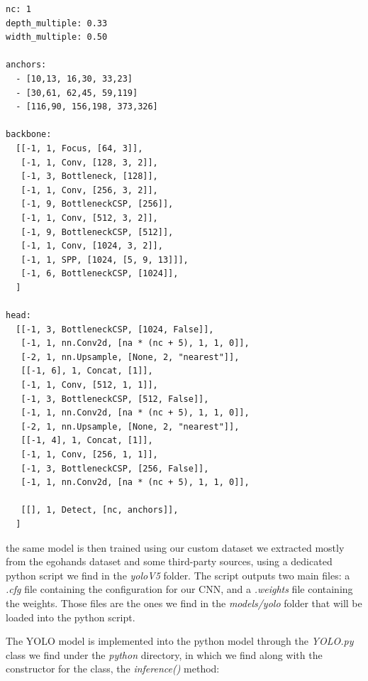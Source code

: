 \begin{lstlisting}[]
nc: 1
depth_multiple: 0.33
width_multiple: 0.50

anchors:
  - [10,13, 16,30, 33,23] 
  - [30,61, 62,45, 59,119]
  - [116,90, 156,198, 373,326] 

backbone:
  [[-1, 1, Focus, [64, 3]],
   [-1, 1, Conv, [128, 3, 2]],
   [-1, 3, Bottleneck, [128]],
   [-1, 1, Conv, [256, 3, 2]],
   [-1, 9, BottleneckCSP, [256]],
   [-1, 1, Conv, [512, 3, 2]], 
   [-1, 9, BottleneckCSP, [512]],
   [-1, 1, Conv, [1024, 3, 2]],
   [-1, 1, SPP, [1024, [5, 9, 13]]],
   [-1, 6, BottleneckCSP, [1024]],
  ]

head:
  [[-1, 3, BottleneckCSP, [1024, False]],
   [-1, 1, nn.Conv2d, [na * (nc + 5), 1, 1, 0]],
   [-2, 1, nn.Upsample, [None, 2, "nearest"]],
   [[-1, 6], 1, Concat, [1]],
   [-1, 1, Conv, [512, 1, 1]],
   [-1, 3, BottleneckCSP, [512, False]],
   [-1, 1, nn.Conv2d, [na * (nc + 5), 1, 1, 0]],
   [-2, 1, nn.Upsample, [None, 2, "nearest"]],
   [[-1, 4], 1, Concat, [1]],
   [-1, 1, Conv, [256, 1, 1]],
   [-1, 3, BottleneckCSP, [256, False]],
   [-1, 1, nn.Conv2d, [na * (nc + 5), 1, 1, 0]],

   [[], 1, Detect, [nc, anchors]],
  ]
\end{lstlisting}

the same model is then trained using our custom dataset we extracted mostly
from the egohands dataset and some third-party sources, using a dedicated
python script we find in the \textit{yoloV5} folder.
The script outputs two main files: a \textit{.cfg} file containing the
configuration for our CNN, and a \textit{.weights} file containing the weights.
Those files are the ones we find in the \textit{models/yolo} folder
that will be loaded into the python script.

The YOLO model is implemented into the python model through the
\textit{YOLO.py} class we find under the \textit{python} directory, in which we
find along with the constructor for
the class, the \textit{inference()} method:

